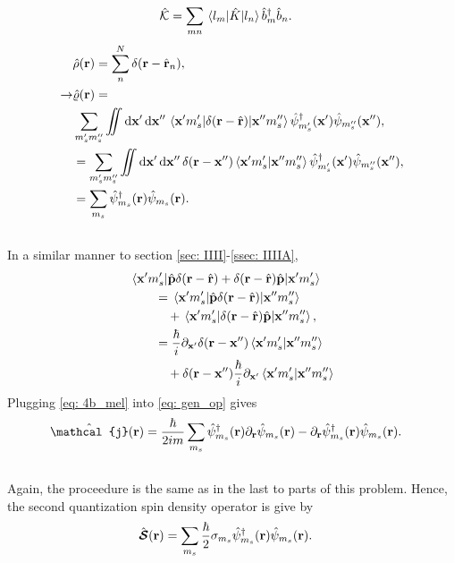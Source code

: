 \documentclass[
a4paper,
10pt,
twoside,
]{article}
\begin{document}
\begin{align}
	\hat{\mathcal{K}} &= \sum_{mn}\mel*{l_m}{\hat{K}}{l_n}\hat{b}_{m}^\dagger \hat{b}_{n}.
	\label{eq: gen_op}
\end{align}
\begin{align}
	&\hat{\rho}(\vb{r}) = \sum_{n}^N \delta(\vb{r}-\hat{\vb{r}}_n),\\
	\rightarrow &\hat{\varrho}(\vb{r}) = \nonumber\\
	&\sum_{m_s'm_s''}\iint \dd{\vb{x}'}\dd{\vb{x}''} \mel*{\vb{x}'m_s'}{\delta(\vb{r}-\hat{\vb{r}})}{\vb{x}''m_s''}\hat{\psi}_{m_s'}^\dagger(\vb{x}') \hat{\psi}_{m_s''}(\vb{x}''),\\
	&= \sum_{m_s'm_s''}\iint \dd{\vb{x}'}\dd{\vb{x}''} \delta(\vb{r}-\vb{x}'')\ip*{\vb{x}'m_s'}{\vb{x}''m_s''}\hat{\psi}_{m_s'}^\dagger(\vb{x}') \hat{\psi}_{m_s''}(\vb{x}''),\\
	&= \sum_{m_s}\hat{\psi}_{m_s}^\dagger(\vb{r}) \hat{\psi}_{m_s}(\vb{r}).
\end{align}


\subsection{}\label{ssec: IIIIB}


In a similar manner to section \ref{sec: IIII}-\ref{ssec: IIIIA},
\begin{align}
	&\mel*{\vb{x}'m_s'}{\hat{\vb{p}}\delta(\vb{r}-\hat{\vb{r}})+\delta(\vb{r}-\hat{\vb{r}})\hat{\vb{p}}}{\vb{x}'m_s'}\nonumber\\
		&\qquad= \mel*{\vb{x}'m_s'}{\hat{\vb{p}}\delta(\vb{r}-\hat{\vb{r}})}{\vb{x}''m_s''}\nonumber\\
		&\qquad\quad+\mel*{\vb{x}'m_s'}{\delta(\vb{r}-\hat{\vb{r}})\hat{\vb{p}}}{\vb{x}''m_s''},\\
		&\qquad= \frac{\hbar}{i}\partial_{\vb{x}'}\delta(\vb{r}-\vb{x}'')\ip*{\vb{x}'m_s'}{\vb{x}''m_s''}\nonumber\\
		&\qquad\quad+ \delta(\vb{r}-\vb{x}'')\frac{\hbar}{i}\partial_{\vb{x}'}\ip*{\vb{x}'m_s'}{\vb{x}''m_s''}
		\label{eq: 4b_mel}
\end{align}
Plugging \ref{eq: 4b_mel} into \ref{eq: gen_op} gives
\begin{align}
	\hat{\bm{\mathcal{j}}}(\vb{r}) &= \frac{\hbar}{2im} \sum_{m_s} \hat{\psi}_{m_s}^\dagger(\vb{r})\partial_{\vb{r}}\hat{\psi}_{m_s}(\vb{r}) - \partial_{\vb{r}}\hat{\psi}_{m_s}^\dagger(\vb{r})\hat{\psi}_{m_s}(\vb{r}).
\end{align}


\subsection{}\label{ssec: IIIIC}


Again, the proceedure is the same as in the last to parts of this problem.
Hence, the second quantization spin density operator is give by
\begin{align}
	\hat{\bm{\mathcal{S}}}(\vb{r}) &= \sum_{m_s} \frac{\hbar}{2}\sigma_{m_s} \hat{\psi}_{m_s}^\dagger(\vb{r})\hat{\psi}_{m_s}(\vb{r}).
\end{align}


\stopmcols
\end{document}
